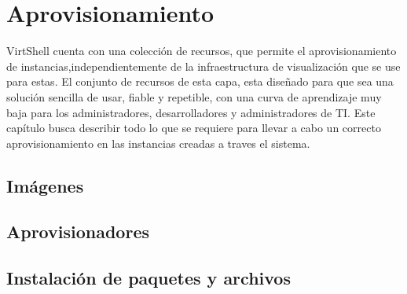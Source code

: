 \chapter{Aprovisionamiento}
\label{capaprovisionamiento}

VirtShell cuenta con una colección de recursos, que permite el aprovisionamiento de instancias,independientemente de la infraestructura de visualización que se use para estas. El conjunto de recursos de esta capa, esta diseñado para que sea una solución sencilla de usar, fiable y repetible, con una curva de aprendizaje muy baja para los administradores, desarrolladores y administradores de TI. Este capítulo busca describir todo lo que se requiere para llevar a cabo un correcto aprovisionamiento en las instancias creadas a traves el sistema.

\section{Imágenes}


\section{Aprovisionadores}

\section{Instalación de paquetes y archivos}



